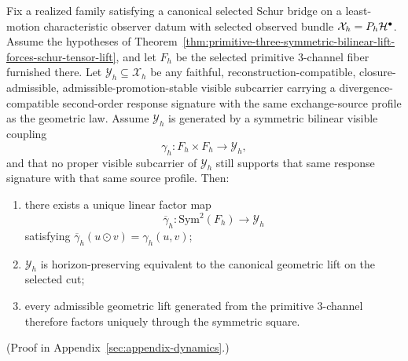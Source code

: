 \begin{theorem}
\label{thm:geometric-symmetric-square-factorization}
Fix a realized family satisfying a canonical selected Schur bridge on a
least-motion characteristic observer datum with selected observed bundle
\(\mathcal X_h=P_h\mathcal{H}^\bullet\). Assume the hypotheses of
Theorem~\ref{thm:primitive-three-symmetric-bilinear-lift-forces-schur-tensor-lift},
and let \(F_h\) be the selected primitive \(3\)-channel fiber furnished there.
Let \(\mathcal Y_h\subseteq\mathcal X_h\) be any faithful,
reconstruction-compatible, closure-admissible,
admissible-promotion-stable visible subcarrier carrying a
divergence-compatible second-order response signature with the same
exchange-source profile as the geometric law. Assume \(\mathcal Y_h\) is
generated by a symmetric bilinear visible coupling
\[
\gamma_h:F_h\times F_h\to \mathcal Y_h,
\]
and that no proper visible subcarrier of \(\mathcal Y_h\) still supports that
same response signature with that same source profile. Then:
\begin{enumerate}[label=(\alph*), leftmargin=2em, itemsep=0.2em]
\item there exists a unique linear factor map
      \[
      \overline{\gamma}_h:\mathrm{Sym}^2(F_h)\to \mathcal Y_h
      \]
      satisfying \(\overline{\gamma}_h(u\odot v)=\gamma_h(u,v)\);
\item \(\mathcal Y_h\) is horizon-preserving equivalent to the canonical
      geometric lift on the selected cut;
\item every admissible geometric lift generated from the primitive
      \(3\)-channel therefore factors uniquely through the symmetric square.
\end{enumerate}
\end{theorem}

(Proof in Appendix~\ref{sec:appendix-dynamics}.)

